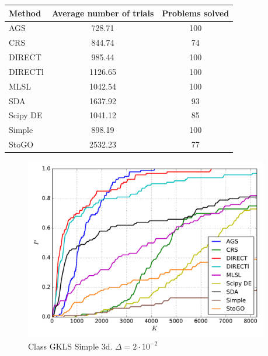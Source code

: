 \documentclass[a4paper]{article}
\begin{document}
\begin{tabular}{lcc}
\hline
 Method   &  Average number of trials  &  Problems solved  \\
\hline
 AGS      &           728.71           &        100        \\
 CRS      &           844.74           &        74         \\
 DIRECT   &           985.44           &        100        \\
 DIRECTl  &          1126.65           &        100        \\
 MLSL     &          1042.54           &        100        \\
 SDA      &          1637.92           &        93         \\
 Scipy DE &          1041.12           &        85         \\
 Simple   &           898.19           &        100        \\
 StoGO    &          2532.23           &        77         \\
\hline
\end{tabular}
\begin{figure}[H]
  \center
  \includegraphics[width=0.95\textwidth]{../experiments/gklss3d/cmc.pdf}
  \caption{Class GKLS Simple 3d. $\Delta=2\cdot10^{-2}$}
\end{figure}
\end{document}
